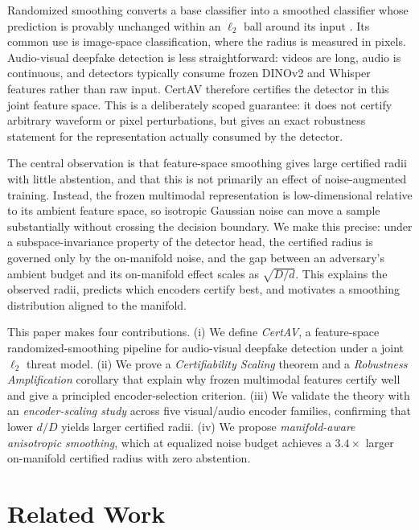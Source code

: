 \documentclass{article}
\begin{document}
Randomized smoothing converts a base classifier into a smoothed classifier whose prediction is provably unchanged within an $\ell_2$ ball around its input \cite{cohen2019certified}. Its common use is image-space classification, where the radius is measured in pixels. Audio-visual deepfake detection is less straightforward: videos are long, audio is continuous, and detectors typically consume frozen DINOv2 \cite{oquab2024dinov2} and Whisper \cite{radford2023whisper} features rather than raw input. CertAV therefore certifies the detector in this joint feature space. This is a deliberately scoped guarantee: it does not certify arbitrary waveform or pixel perturbations, but gives an exact robustness statement for the representation actually consumed by the detector.

The central observation is that feature-space smoothing gives large certified radii with little abstention, and that this is not primarily an effect of noise-augmented training. Instead, the frozen multimodal representation is low-dimensional relative to its ambient feature space, so isotropic Gaussian noise can move a sample substantially without crossing the decision boundary. We make this precise: under a subspace-invariance property of the detector head, the certified radius is governed only by the on-manifold noise, and the gap between an adversary's ambient budget and its on-manifold effect scales as $\sqrt{D/d}$. This explains the observed radii, predicts which encoders certify best, and motivates a smoothing distribution aligned to the manifold.

This paper makes four contributions.
(i) We define \emph{CertAV}, a feature-space randomized-smoothing pipeline for audio-visual deepfake detection under a joint $\ell_2$ threat model.
(ii) We prove a \emph{Certifiability Scaling} theorem and a \emph{Robustness Amplification} corollary that explain why frozen multimodal features certify well and give a principled encoder-selection criterion.
(iii) We validate the theory with an \emph{encoder-scaling study} across five visual/audio encoder families, confirming that lower $d/D$ yields larger certified radii.
(iv) We propose \emph{manifold-aware anisotropic smoothing}, which at equalized noise budget achieves a $3.4\times$ larger on-manifold certified radius with zero abstention.

\section{Related Work}
\label{sec:related}
\end{document}
